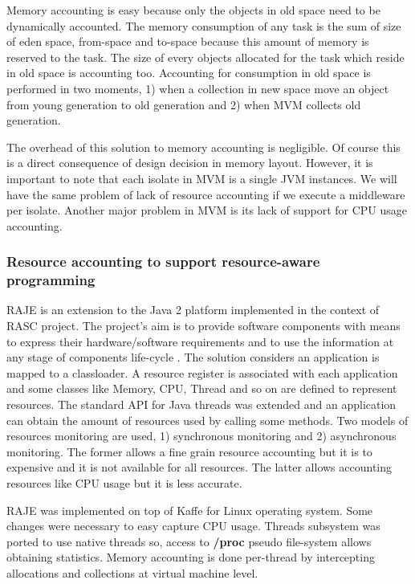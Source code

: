 Memory accounting is easy because only the objects in old space need to be dynamically accounted. The memory consumption of any task is the sum of size of eden space, from-space and to-space because this amount of memory is reserved to the task. The size of every objects allocated for the task which reside in old space is accounting too. Accounting for consumption in old space is performed in two moments, 1) when a collection in new space move an object from young generation to old generation and 2) when MVM collects old generation.

The overhead of this solution to memory accounting is negligible. Of course this is a direct consequence of design decision in memory layout. However, it is important to note that each isolate in MVM is a single JVM instances. We will have the same problem of lack of resource accounting if we execute a middleware per isolate. Another major problem in MVM is its lack of support for CPU usage accounting.

\subsubsection*{Resource accounting to support resource-aware programming \label{RAJE}}
RAJE is an extension to the Java 2 platform implemented in the context of RASC project. The project's aim is to provide software components with means to express their hardware/software requirements and to use the information at any stage of components life-cycle \cite{guidec:hal-00342142}. The solution considers an application is mapped to a classloader. A resource register is associated with each application and some classes like Memory, CPU, Thread and so on are defined to represent resources. The standard API for Java threads was extended and an application can obtain the amount of resources used by calling some methods. Two models of resources monitoring are used, 1) synchronous monitoring and 2) asynchronous monitoring. The former allows a fine grain resource accounting but it is to expensive and it is not available for all resources. The latter allows accounting resources like CPU usage but it is less accurate.

RAJE was implemented on top of Kaffe for Linux operating system. Some changes were necessary to easy capture CPU usage. Threads subsystem was ported to use native threads so, access to \textbf{/proc} pseudo file-system allows obtaining statistics. Memory accounting is done per-thread by intercepting allocations and collections at virtual machine level.

